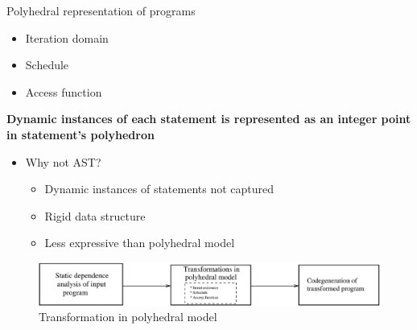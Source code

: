 \documentclass{beamer}
\begin{document}
\begin{frame}{Polyhedral representation of programs}
\begin{itemize}
\item Iteration domain
\item Schedule
\item Access function
\end{itemize}

\textbf{Dynamic instances of each statement is represented as an integer point in statement's polyhedron}
\begin{itemize}
\item Why not AST?
	\begin{itemize}
	\item Dynamic instances of statements not captured
	\item Rigid data structure
	\item Less expressive than polyhedral model
	\end{itemize}
\end{itemize}

\begin{figure}
\begin{center}
  \includegraphics[width=1\textwidth]{images/poly_steps.eps}
  \caption{Transformation in polyhedral model}
  \label{fig:iter1}
\end{center}  
\end{figure}

\end{frame}
\end{document}
